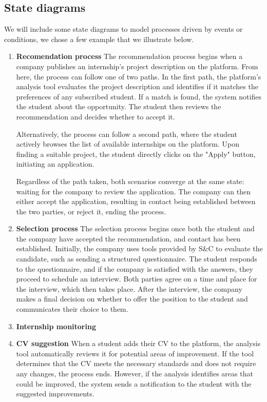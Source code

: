 \subsection{State diagrams}
We will include some state diagrams to model processes driven by events or conditions, we chose a few example that we illustrate below.
\begin{enumerate}

\item \textbf{Recomendation process}
The recommendation process begins when a company publishes an internship's project description on the platform. From here, the process can follow one of two paths. In the first path, the platform’s analysis tool evaluates the project description and identifies if it matches the preferences of any subscribed student. If a match is found, the system notifies the student about the opportunity. The student then reviews the recommendation and decides whether to accept it.

Alternatively, the process can follow a second path, where the student actively browses the list of available internships on the platform. Upon finding a suitable project, the student directly clicks on the "Apply" button, initiating an application.

Regardless of the path taken, both scenarios converge at the same state: waiting for the company to review the application. The company can then either accept the application, resulting in contact being established between the two parties, or reject it, ending the process.

\item \textbf{Selection process}
The selection process begins once both the student and the company have accepted the recommendation, and contact has been established. Initially, the company uses tools provided by S\&C to evaluate the candidate, such as sending a structured questionnaire. The student responds to the questionnaire, and if the company is satisfied with the answers, they proceed to schedule an interview. Both parties agree on a time and place for the interview, which then takes place. After the interview, the company makes a final decision on whether to offer the position to the student and communicates their choice to them.

\item \textbf{Internship monitoring}

\item \textbf{CV suggestion}
When a student adds their CV to the platform, the analysis tool automatically reviews it for potential areas of improvement. If the tool determines that the CV meets the necessary standards and does not require any changes, the process ends. However, if the analysis identifies areas that could be improved, the system sends a notification to the student with the suggested improvements.


\end{enumerate}
